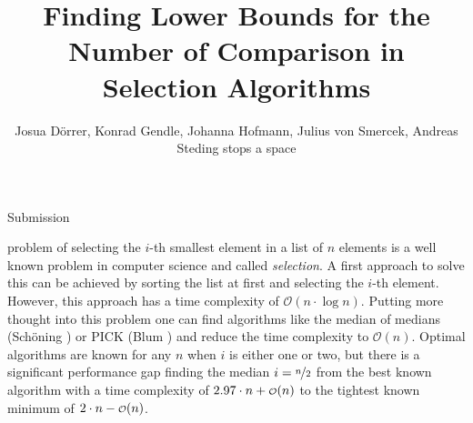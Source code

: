 \documentclass[10pt,journal,compsoc]{IEEEtran}
\newcommand\smallO{
  \mathchoice
    {{\scriptstyle\mathcal{O}}}%
    {{\scriptstyle\mathcal{O}}}%
    {{\scriptscriptstyle\mathcal{O}}}%
    {\scalebox{.65}{$\scriptscriptstyle\mathcal{O}$}}%
  }
\begin{document}
\title{Finding Lower Bounds for the Number of Comparison in Selection Algorithms}

\author{Josua Dörrer, Konrad Gendle, Johanna Hofmann, Julius von Smercek, Andreas Steding%
  stops a space }

%
{Submission}



\maketitle

\IEEEdisplaynontitleabstractindextext


\IEEEpeerreviewmaketitle

  problem of selecting the $i$-th smallest element in a list of $n$ elements is
a well known problem in computer science and called \textit{selection}. A first approach to solve
this can be achieved by sorting the list at first and selecting the $i$-th element. However, this
approach has a time complexity of $\mathcal{O}(n \cdot \log n)$. Putting more thought into this
problem one can find algorithms like the median of medians (Schöning \cite{Schoening1993}) or PICK
(Blum \cite{Blum1972}) and reduce the time complexity to $\mathcal{O}(n)$. Optimal algorithms are
known for any $n$ when $i$ is either one or two, but there is a significant performance gap finding
the median $i = \nicefrac{n}{2}$ from the best known algorithm with a time complexity of $2.97 \cdot
  n + \smallO(n)$ to the tightest known minimum of $2 \cdot n - \smallO(n)$.
\end{document}

